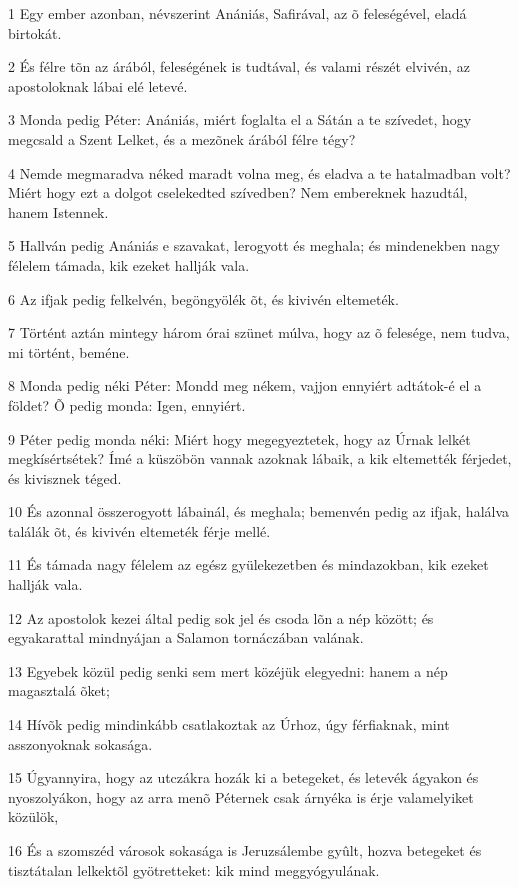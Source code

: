\par 1 Egy ember azonban, névszerint Anániás, Safirával, az õ feleségével, eladá birtokát.
\par 2 És félre tõn az árából, feleségének is tudtával, és valami részét elvivén, az apostoloknak lábai elé letevé.
\par 3 Monda pedig Péter: Anániás, miért foglalta el a Sátán a te szívedet, hogy megcsald a Szent Lelket, és a mezõnek árából félre tégy?
\par 4 Nemde megmaradva néked maradt volna meg, és eladva a te hatalmadban volt? Miért hogy ezt a dolgot cselekedted szívedben? Nem embereknek hazudtál, hanem Istennek.
\par 5 Hallván pedig Anániás e szavakat, lerogyott és meghala; és mindenekben nagy félelem támada, kik ezeket hallják vala.
\par 6 Az ifjak pedig felkelvén, begöngyölék õt, és kivivén eltemeték.
\par 7 Történt aztán mintegy három órai szünet múlva, hogy az õ felesége, nem tudva, mi történt, beméne.
\par 8 Monda pedig néki Péter: Mondd meg nékem, vajjon ennyiért adtátok-é el a földet? Õ pedig monda: Igen, ennyiért.
\par 9 Péter pedig monda néki: Miért hogy megegyeztetek, hogy az Úrnak lelkét megkísértsétek? Ímé a küszöbön vannak azoknak lábaik, a kik eltemették férjedet, és kivisznek téged.
\par 10 És azonnal összerogyott lábainál, és meghala; bemenvén pedig az ifjak, halálva találák õt, és kivivén eltemeték férje mellé.
\par 11 És támada nagy félelem az egész gyülekezetben és mindazokban, kik ezeket hallják vala.
\par 12 Az apostolok kezei által pedig sok jel és csoda lõn a nép között; és egyakarattal mindnyájan a Salamon tornáczában valának.
\par 13 Egyebek közül pedig senki sem mert közéjük elegyedni: hanem a nép magasztalá õket;
\par 14 Hívõk pedig mindinkább csatlakoztak az Úrhoz, úgy férfiaknak, mint asszonyoknak sokasága.
\par 15 Úgyannyira, hogy az utczákra hozák ki a betegeket, és letevék ágyakon és nyoszolyákon, hogy az arra menõ Péternek csak árnyéka is érje valamelyiket közülök,
\par 16 És a szomszéd városok sokasága is Jeruzsálembe gyûlt, hozva betegeket és tisztátalan lelkektõl gyötretteket: kik mind meggyógyulának.
